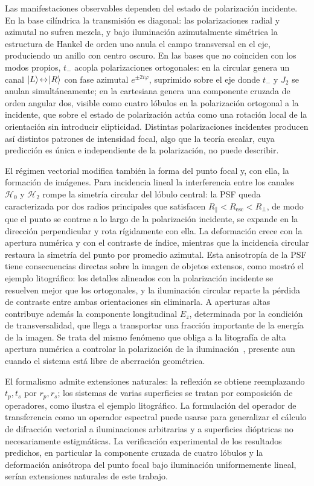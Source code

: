 Las manifestaciones observables dependen del estado de polarización
incidente. En la base cilíndrica la transmisión es diagonal: las
polarizaciones radial y azimutal no sufren mezcla, y bajo iluminación
azimutalmente simétrica la estructura de Hankel de orden uno anula el campo
transversal en el eje, produciendo un anillo con centro oscuro. En las bases
que no coinciden con los modos propios, $t_-$ acopla polarizaciones
ortogonales: en la circular genera un canal
$\ket{L}\!\leftrightarrow\!\ket{R}$ con fase azimutal $e^{\pm2i\varphi}$,
suprimido sobre el eje donde $t_-$ y $J_2$ se anulan simultáneamente; en la
cartesiana genera una componente cruzada de orden angular dos, visible como
cuatro lóbulos en la polarización ortogonal a la incidente, que sobre el
estado de polarización actúa como una rotación local de la orientación sin
introducir elipticidad. Distintas polarizaciones incidentes producen así
distintos patrones de intensidad focal, algo que la teoría escalar, cuya
predicción es única e independiente de la polarización, no puede describir.

El régimen vectorial modifica también la forma del punto focal y, con ella,
la formación de imágenes. Para incidencia lineal la interferencia entre los
canales $\mathscr H_0$ y $\mathscr H_2$ rompe la simetría circular del lóbulo
central: la PSF queda caracterizada por dos radios principales que satisfacen
$R_\parallel<R_{\mathrm{esc}}<R_\perp$, de modo que el punto se contrae a lo
largo de la polarización incidente, se expande en la dirección perpendicular
y rota rígidamente con ella. La deformación crece con la apertura numérica y
con el contraste de índice, mientras que la incidencia circular restaura la
simetría del punto por promedio azimutal. Esta anisotropía de la PSF tiene
consecuencias directas sobre la imagen de objetos extensos, como mostró el
ejemplo litográfico: los detalles alineados con la polarización incidente se
resuelven mejor que los ortogonales, y la iluminación circular reparte la
pérdida de contraste entre ambas orientaciones sin eliminarla. A aperturas
altas contribuye además la componente longitudinal $E_z$, determinada por la
condición de transversalidad, que llega a transportar una fracción importante
de la energía de la imagen. Se trata del mismo fenómeno que obliga a la
litografía de alta apertura numérica a controlar la polarización de la
iluminación~\cite{flagello1996, ruoff2009}, presente aun cuando el sistema
está libre de aberración geométrica.

El formalismo admite extensiones naturales: la reflexión se obtiene
reemplazando $t_p,t_s$ por $r_p,r_s$; los sistemas de varias superficies se
tratan por composición de operadores, como ilustra el ejemplo litográfico. La
formulación del operador de transferencia como un operador espectral puede
usarse para generalizar el cálculo de difracción vectorial a iluminaciones
arbitrarias y a superficies dióptricas no necesariamente estigmáticas. La
verificación experimental de los resultados predichos, en particular la
componente cruzada de cuatro lóbulos y la deformación anisótropa del punto
focal bajo iluminación uniformemente lineal, serían extensiones naturales de este trabajo.
